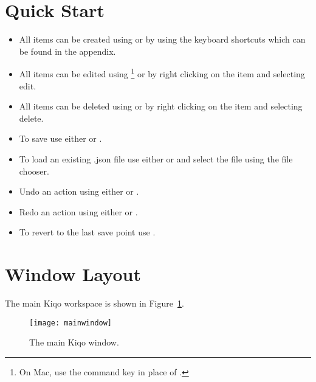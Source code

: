\documentclass[11pt,fleqn]{book} %
\begin{document}
\section{Quick Start}
\begin{itemize}
    \item All items can be created using  or by using the keyboard shortcuts which can be found
    in the appendix.
    \item All items can be edited using \footnote{On Mac, use the command key \keys{\cmd} in place of \keys{\ctrl}.}
     or by right clicking on the item and selecting edit.
    \item All items can be deleted using  or by right clicking on the item and selecting delete.
    \item To save use either  or .
    \item To load an existing .json file use either  or  and select the file using the file chooser.
    \item Undo an action using either  or .
    \item Redo an action using either  or .
    \item To revert to the last save point use .
\end{itemize}
\clearpage

\section{Window Layout}
The main Kiqo workspace is shown in Figure~\ref{fig:mainwindow}.

\begin{figure}[H]
  \centering
  \texttt{[image: mainwindow]}
  \caption{The main Kiqo window.\label{fig:mainwindow}}
\end{figure}
\end{document}
